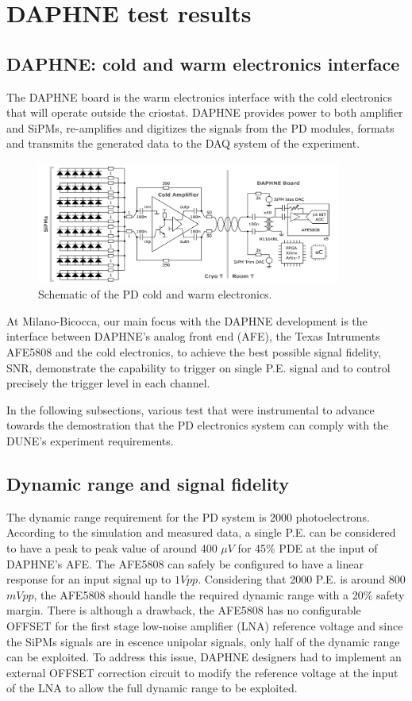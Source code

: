 \section{DAPHNE test results}
\subsection{DAPHNE: cold and warm electronics interface}

The DAPHNE board is the warm electronics interface with the cold electronics that will operate outside the criostat. DAPHNE provides power to both amplifier and SiPMs, re-amplifies and digitizes the signals from the PD modules, formats and transmits the generated data to the DAQ system of the experiment. 

\begin{figure}[h]
\centering
\includegraphics[width=100mm]{Images/pd_electronics.png}
\caption[]{Schematic of the PD cold and warm electronics.}
\label{fig:pd_electronics}
\end{figure}

At Milano-Bicocca, our main focus with the DAPHNE development is the interface between DAPHNE's analog front end (AFE), the Texas Intruments AFE5808 and the cold electronics, to achieve the best possible signal fidelity, SNR, demonstrate the capability to trigger on single P.E. signal and to control precisely the trigger level in each channel.

In the following subsections, various test that were instrumental to advance towards the demostration that the PD electronics system can comply with the DUNE's experiment requirements. 

\subsection{Dynamic range and signal fidelity}

The dynamic range requirement for the PD system is 2000 photoelectrons. According to the simulation and measured data, a single P.E. can be considered to have a peak to peak value of around 400 ${\mu}V$ for 45\% PDE at the input of DAPHNE's AFE. The AFE5808 \cite{afe5808a} can safely be configured to have a linear response for an input signal up to $1Vpp$. Considering that 2000 P.E. is around 800 $mVpp$, the AFE5808 should handle the required dynamic range with a 20\% safety margin. There is although a drawback, the AFE5808 has no configurable OFFSET for the first stage low-noise amplifier (LNA) reference voltage and since the SiPMs signals are in escence unipolar signals, only half of the dynamic range can be exploited. To address this issue, DAPHNE designers had to implement an external OFFSET correction circuit to modify the reference voltage at the input of the LNA to allow the full dynamic range to be exploited.

